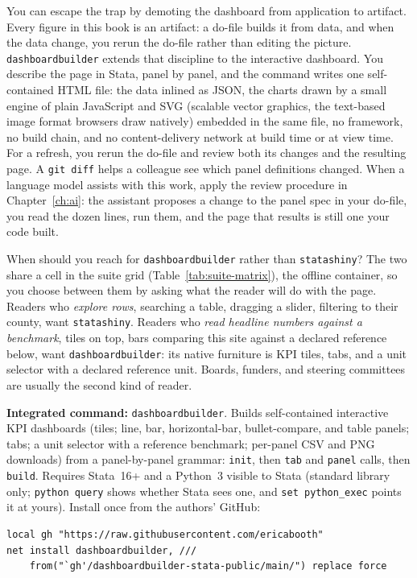 \documentclass[
    a4paper,
    fontsize=10pt,
    twoside=true,
    numbers=noenddot,
]{kaobook}
\begin{document}
You can escape the trap by demoting the dashboard from application to artifact. Every figure in this book is an artifact: a do-file builds it from data, and when the data change, you rerun the do-file rather than editing the picture. \texttt{dashboardbuilder} extends that discipline to the interactive dashboard. You describe the page in Stata, panel by panel, and the command writes one self-contained HTML file: the data inlined as JSON, the charts drawn by a small engine of plain JavaScript and SVG (scalable vector graphics, the text-based image format browsers draw natively) embedded in the same file, no framework, no build chain, and no content-delivery network at build time or at view time. For a refresh, you rerun the do-file and review both its changes and the resulting page. A \texttt{git diff} helps a colleague see which panel definitions changed. When a language model assists with this work, apply the review procedure in Chapter~\ref{ch:ai}: the assistant proposes a change to the panel spec in your do-file, you read the dozen lines, run them, and the page that results is still one your code built.

When should you reach for \texttt{dashboardbuilder} rather than \texttt{statashiny}? The two share a cell in the suite grid (Table~\ref{tab:suite-matrix}), the offline container, so you choose between them by asking what the reader will do with the page. Readers who \emph{explore rows}, searching a table, dragging a slider, filtering to their county, want \texttt{statashiny}. Readers who \emph{read headline numbers against a benchmark}, tiles on top, bars comparing this site against a declared reference below, want \texttt{dashboardbuilder}: its native furniture is KPI tiles, tabs, and a unit selector with a declared reference unit. Boards, funders, and steering committees are usually the second kind of reader.

\begin{kaobox}[frametitle=Package Integration: \texttt{dashboardbuilder}]
\textbf{Integrated command:} \texttt{dashboardbuilder}. Builds self-contained interactive KPI dashboards (tiles; line, bar, horizontal-bar, bullet-compare, and table panels; tabs; a unit selector with a reference benchmark; per-panel CSV and PNG downloads) from a panel-by-panel grammar: \texttt{init}, then \texttt{tab} and \texttt{panel} calls, then \texttt{build}. Requires Stata~16+ and a Python~3 visible to Stata (standard library only; \texttt{python query} shows whether Stata sees one, and \texttt{set python\_exec} points it at yours). Install once from the authors' GitHub:
\par
{\footnotesize
\begin{verbatim}
local gh "https://raw.githubusercontent.com/ericabooth"
net install dashboardbuilder, ///
    from("`gh'/dashboardbuilder-stata-public/main/") replace force
\end{verbatim}
}
\end{kaobox}
\end{document}
